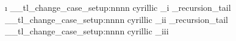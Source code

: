     { \i }
  \__tl_change_case_setup:nnnn
    { cyrillic }
    { _i }
    {
      \cyra         \CYRA
      \cyrabhch     \CYRABHCH
      \cyrabhchdsc  \CYRABHCHDSC
      \cyrabhdze    \CYRABHDZE
      \cyrabhha     \CYRABHHA
      \cyrae        \CYRAE
      \cyrb         \CYRB
      \cyrbyus      \CYRBYUS
      \cyrc         \CYRC
      \cyrch        \CYRCH
      \cyrchldsc    \CYRCHLDSC
      \cyrchrdsc    \CYRCHRDSC
      \cyrchvcrs    \CYRCHVCRS
      \cyrd         \CYRD
      \cyrdelta     \CYRDELTA
      \cyrdje       \CYRDJE
      \cyrdze       \CYRDZE
      \cyrdzhe      \CYRDZHE
      \cyre         \CYRE
      \cyreps       \CYREPS
      \cyrerev      \CYREREV
      \cyrery       \CYRERY
      \cyrf         \CYRF
      \cyrfita      \CYRFITA
      \cyrg         \CYRG
      \cyrgdsc      \CYRGDSC
      \cyrgdschcrs  \CYRGDSCHCRS
      \cyrghcrs     \CYRGHCRS
      \cyrghk       \CYRGHK
      \cyrgup       \CYRGUP
    }
    { \q_recursion_tail }
  \__tl_change_case_setup:nnnn
    { cyrillic }
    { _ii }
    {
      \cyrh         \CYRH
      \cyrhdsc      \CYRHDSC
      \cyrhhcrs     \CYRHHCRS
      \cyrhhk       \CYRHHK
      \cyrhrdsn     \CYRHRDSN
      \cyri         \CYRI
      \cyrie        \CYRIE
      \cyrii        \CYRII
      \cyrishrt     \CYRISHRT
      \cyrishrtdsc  \CYRISHRTDSC
      \cyrizh       \CYRIZH
      \cyrje        \CYRJE
      \cyrk         \CYRK
      \cyrkbeak     \CYRKBEAK
      \cyrkdsc      \CYRKDSC
      \cyrkhcrs     \CYRKHCRS
      \cyrkhk       \CYRKHK
      \cyrkvcrs     \CYRKVCRS
      \cyrl         \CYRL
      \cyrldsc      \CYRLDSC
      \cyrlhk       \CYRLHK
      \cyrlje       \CYRLJE
      \cyrm         \CYRM
      \cyrmdsc      \CYRMDSC
      \cyrmhk       \CYRMHK
      \cyrn         \CYRN
      \cyrndsc      \CYRNDSC
      \cyrng        \CYRNG
      \cyrnhk       \CYRNHK
      \cyrnje       \CYRNJE
      \cyrnlhk      \CYRNLHK
    }
    { \q_recursion_tail }
  \__tl_change_case_setup:nnnn
    { cyrillic }
    { _iii }
    {
      \cyro         \CYRO
      \cyrotld      \CYROTLD
      \cyrp         \CYRP
      \cyrphk       \CYRPHK
      \cyrq         \CYRQ
      \cyrr         \CYRR
      \cyrrdsc      \CYRRDSC
      \cyrrhk       \CYRRHK
      \cyrrtick     \CYRRTICK
      \cyrs         \CYRS
      \cyrsacrs     \CYRSACRS
      \cyrschwa     \CYRSCHWA
      \cyrsdsc      \CYRSDSC
      \cyrsemisftsn \CYRSEMISFTSN
      \cyrsftsn     \CYRSFTSN
      \cyrsh        \CYRSH
      \cyrshch      \CYRSHCH
      \cyrshha      \CYRSHHA
      \cyrt         \CYRT
      \cyrtdsc      \CYRTDSC
      \cyrtetse     \CYRTETSE
      \cyrtshe      \CYRTSHE
      \cyru         \CYRU
      \cyrushrt     \CYRUSHRT
    }
